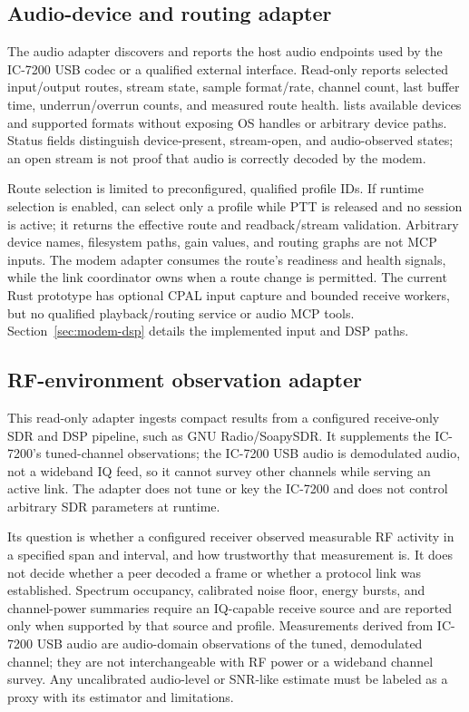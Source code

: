 \documentclass[11pt,a4paper]{article}
\begin{document}
\subsection{Audio-device and routing adapter}
The audio adapter discovers and reports the host audio endpoints used by the
IC-7200 USB codec or a qualified external interface. Read-only
 reports selected input/output routes, stream state,
sample format/rate, channel count, last buffer time, underrun/overrun counts,
and measured route health.  lists available
devices and supported formats without exposing OS handles or arbitrary
device paths. Status fields distinguish device-present, stream-open, and
audio-observed states; an open stream is not proof that audio is correctly
decoded by the modem.

Route selection is limited to preconfigured, qualified profile IDs. If
runtime selection is enabled,  can select only a
profile while PTT is released and no session is active; it returns the
effective route and readback/stream validation. Arbitrary device names,
filesystem paths, gain values, and routing graphs are not MCP inputs. The
modem adapter consumes the route's readiness and health signals, while the
link coordinator owns when a route change is permitted. The current Rust prototype has optional CPAL input capture and bounded
receive workers, but no qualified playback/routing service or audio MCP tools.
Section~\ref{sec:modem-dsp} details the implemented input and DSP paths.

\subsection{RF-environment observation adapter}
This read-only adapter ingests compact results from a configured
receive-only SDR and DSP pipeline, such as GNU Radio/SoapySDR. It supplements
the IC-7200's tuned-channel observations; the IC-7200 USB audio is demodulated
audio, not a wideband IQ feed, so it cannot survey other channels while
serving an active link. The adapter does not tune or key the IC-7200 and does
not control arbitrary SDR parameters at runtime.

Its question is whether a configured receiver observed measurable RF
activity in a specified span and interval, and how trustworthy that
measurement is. It does not decide whether a peer decoded a frame or whether
a protocol link was established. Spectrum occupancy, calibrated noise floor,
energy bursts, and channel-power summaries require an IQ-capable receive
source and are reported only when supported by that source and profile.
Measurements derived from IC-7200 USB audio are audio-domain observations of
the tuned, demodulated channel; they are not interchangeable with RF power or
a wideband channel survey. Any uncalibrated audio-level or SNR-like estimate
must be labeled as a proxy with its estimator and limitations.
\end{document}
